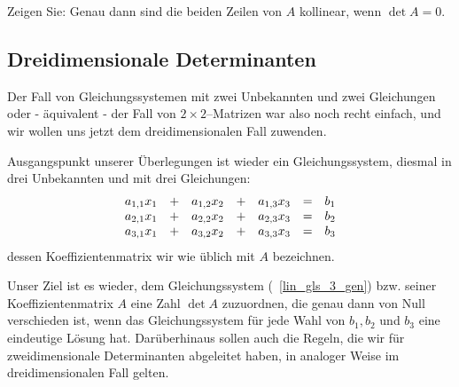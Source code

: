 \begin{aufgabe} Zeigen Sie: Genau dann sind die beiden Zeilen von $A$ kollinear, wenn $\det{A} = 0$. 
\end{aufgabe}

\bigbreak

\bigbreak


\subsection{Dreidimensionale Determinanten}\label{section_det_3}

\setcounter{definition}{0}
\setcounter{beispiel}{0}
\setcounter{notiz}{0}

Der Fall von Gleichungssystemen mit zwei Unbekannten und zwei Gleichungen oder - äquivalent - der Fall 
von $2 \times 2$--Matrizen war also noch recht einfach, und wir wollen uns jetzt dem dreidimensionalen 
Fall zuwenden.

\medbreak

Ausgangspunkt unserer Überlegungen ist wieder ein Gleichungssystem, diesmal in drei Unbekannten und 
mit drei Gleichungen:
  	\begin{equation}\label{lin_gls_3_gen} 
  	\begin{array} {l c l c l c l}
  	a_{1,1} x_1 & + & a_{1,2} x_2 & + & a_{1,3} x_3 & = & b_1 \\
  	a_{2,1} x_1 & + & a_{2,2} x_2 & + & a_{2,3} x_3 & = & b_2 \\
  	a_{3,1} x_1 & + & a_{3,2} x_2 & + & a_{3,3} x_3 & = & b_3 \\
  	\end{array} 
  	\end{equation}
dessen Koeffizientenmatrix wir wie üblich mit $A$ bezeichnen. 

Unser Ziel ist es wieder, dem Gleichungssystem (~\ref{lin_gls_3_gen}) bzw. seiner Koeffizientenmatrix $A$ 
eine Zahl $\det{A}$ zuzuordnen, die genau dann von Null verschieden ist, wenn das Gleichungssystem für 
jede Wahl von $b_1, b_2$ und $b_3$ eine eindeutige Lösung hat. Darüberhinaus sollen auch die Regeln, 
die wir für zweidimensionale Determinanten abgeleitet haben, in analoger Weise im dreidimensionalen Fall 
gelten. 

